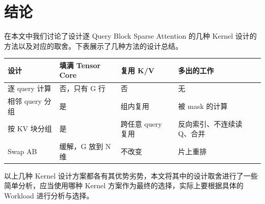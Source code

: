 \section{结论}

在本文中我们讨论了设计逐 Query Block Sparse Attention 的几种 Kernel 设计的方法以及对应的取舍。下表展示了几种方法的设计总结。

\begin{center}
\small
\begin{tabularx}{\linewidth}{@{}l l l Y@{}}
\toprule
设计 & 填满 Tensor Core & 复用 K/V & 多出的工作 \\
\midrule
逐 query 计算 & 否，只有 G 行 & 否 & 无 \\
相邻 query 分组 & 是 & 组内复用 & 被 mask 的计算 \\
按 KV 块分组 & 是 & 跨任意 query 复用 & 反向索引、不连续读 Q、合并 \\
Swap AB & 缓解，G 放到 N 维 & 不改变 & 片上重排 \\
\bottomrule
\end{tabularx}
\end{center}

以上几种 Kernel 设计方案都各有其优势劣势，本文将其中的设计取舍进行了一些简单分析，应当使用哪种 Kernel 方案作为最终的选择，实际上要根据具体的 Workload 进行分析与选择。
